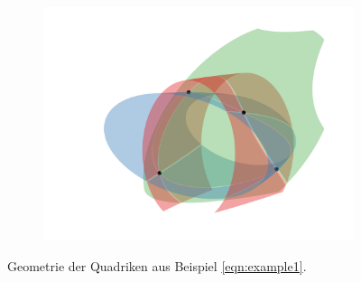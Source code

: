 \documentclass[a4paper,oneside, 11pt, openany%
]{article}
\theoremstyle{custom}
\theoremstyle{custom}
\begin{document}
		 \begin{figure}[H]\ContinuedFloat
			\begin{subfigure}[b]{0.8\textwidth}
				\includegraphics[width=\textwidth]{"images/e3q3_example1_zoom.png"}
			\end{subfigure}
			\caption{Geometrie der Quadriken aus Beispiel \eqref{eqn:example1}.}
		 \end{figure}
	
\end{document}

